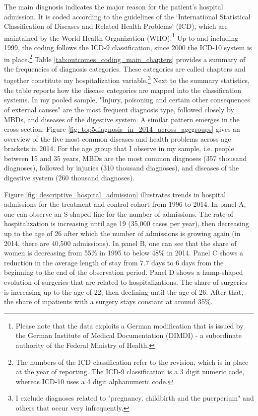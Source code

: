 \documentclass[11pt, a4paper, draft]{article} %
\begin{document}
The main diagnosis indicates the major reason for the patient's hospital admission. It is coded according to the guidelines of the `International Statistical Classification of Diseases and Related Health Problems' (ICD), which are maintained by the World Health Organization (WHO).\footnote{Please note that the data exploits a German modification that is issued by the German Institute of Medical Documentation (DIMDI) - a subordinate authority of the Federal Ministry of Health.} Up to and including 1999, the coding follows the ICD-9 classification, since 2000 the ICD-10 system is in place.\footnote{The numbers of the ICD classification refer to the revision, which is in place at the year of reporting. The ICD-9 classification is a 3 digit numeric code, whereas ICD-10 uses a 4 digit alphanumeric code.} Table \ref{tab:outcomes_coding_main_chapters} provides a summary of the frequencies of diagnosis categories. These categories are called chapters and together constitute my hospitalization variable.\footnote{I exclude diagnoses related to "pregnancy, childbirth and the puerperium" and others that occur very infrequently.} Next to the summary statistics, the table reports how the disease categories are mapped into the classification systems. In my pooled sample, "Injury, poisoning and certain other consequences of external causes" are the most frequent diagnosis type, followed closely by MBDs, and diseases of the digestive system. A similar pattern emerges in the cross-section: Figure \ref{fig: top5diagnosis_in_2014_across_agegroups} gives an overview of the five most common diseases and health problems across age brackets in 2014. For the age group that I observe in my sample, i.e. people between 15 and 35 years, MBDs are the most common diagnoses (357 thousand diagnoses), followed by injuries (310 thousand diagnoses), and diseases of the digestive system (260 thousand diagnoses). %


Figure \ref{fig: descriptive_hospital_admission} illustrates trends in hospital admissions for the treatment and control cohort from 1996 to 2014. In panel A, one can observe an S-shaped line for the number of admissions. The rate of hospitalization is increasing until age 19 (35,000 cases per year), then decreasing up to the age of 26 after which the number of admissions is growing again (in 2014, there are 40,500 admissions). In panel B, one can see that the share of women is decreasing from 55\% in 1995 to below 48\% in 2014. Panel C shows a reduction in the average length of stay from 7.7 days to 6 days from the beginning to the end of the observation period. Panel D shows a hump-shaped evolution of surgeries that are related to hospitalizations. The share of surgeries is increasing up to the age of 22, then declining until the age of 26. After that, the share of inpatients with a surgery stays constant at around 35\%. %
\end{document}
